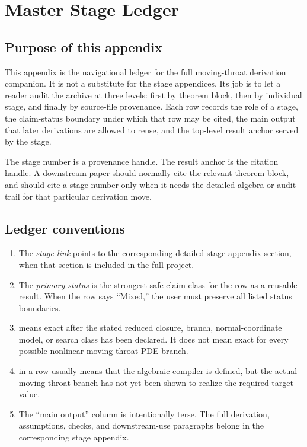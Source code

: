 \chapter{Master Stage Ledger}
\label{app:stage-ledger}

\section{Purpose of this appendix}
\label{sec:stage-ledger-purpose}

This appendix is the navigational ledger for the full moving-throat derivation companion.  It is not a substitute for the stage appendices.  Its job is to let a reader audit the archive at three levels: first by theorem block, then by individual stage, and finally by source-file provenance.  Each row records the role of a stage, the claim-status boundary under which that row may be cited, the main output that later derivations are allowed to reuse, and the top-level result anchor served by the stage.

The stage number is a provenance handle.  The result anchor is the citation handle.  A downstream paper should normally cite the relevant  theorem block, and should cite a stage number only when it needs the detailed algebra or audit trail for that particular derivation move.

\section{Ledger conventions}
\label{sec:stage-ledger-conventions}

\begin{enumerate}[leftmargin=2.4em]
\item The \emph{stage link} points to the corresponding detailed stage appendix section, when that section is included in the full project.
\item The \emph{primary status} is the strongest safe claim class for the row as a reusable result.  When the row says ``Mixed,'' the user must preserve all listed status boundaries.
\item \StatusExactClosure{} means exact after the stated reduced closure, branch, normal-coordinate model, or search class has been declared.  It does not mean exact for every possible nonlinear moving-throat PDE branch.
\item \StatusOpen{} in a row usually means that the algebraic compiler is defined, but the actual moving-throat branch has not yet been shown to realize the required target value.
\item The ``main output'' column is intentionally terse.  The full derivation, assumptions, checks, and downstream-use paragraphs belong in the corresponding stage appendix.
\end{enumerate}

